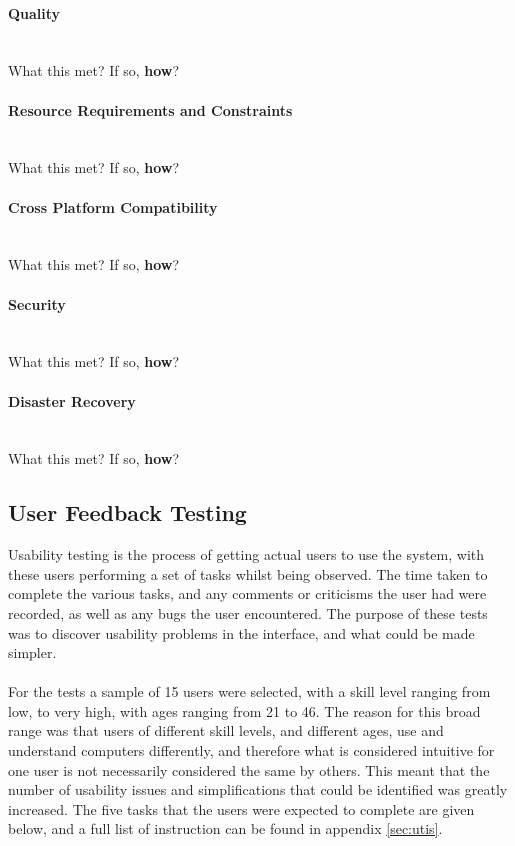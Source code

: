 \paragraph{Quality}\ \\
{\color{red} What this met? If so, \textbf{how}?}

\paragraph{Resource Requirements and Constraints}\ \\
{\color{red} What this met? If so, \textbf{how}?}

\paragraph{Cross Platform Compatibility}\ \\
{\color{red} What this met? If so, \textbf{how}?}

\paragraph{Security}\ \\
{\color{red} What this met? If so, \textbf{how}?}

\paragraph{Disaster Recovery}\ \\
{\color{red} What this met? If so, \textbf{how}?}


\newpage 
\subsection{User Feedback Testing}
Usability testing is the process of getting actual users to use the system, with these users performing a set of tasks whilst being observed. The time taken to complete the various tasks, and any comments or criticisms the user had were recorded, as well as any bugs the user encountered. The purpose of these tests was to discover usability problems in the interface, and what could be made simpler.\ \\
\ \\
For the tests a sample of 15 users were selected, with a skill level ranging from low, to very high, with ages ranging from 21 to 46. The reason for this broad range was that users of different skill levels, and different ages, use and understand computers differently, and therefore what is considered intuitive for one user is not necessarily considered the same by others. This meant that the number of usability issues and simplifications that could be identified was greatly increased. The five tasks that the users were expected to complete are given below, and a full list of instruction can be found in appendix \ref{sec:utis}.


